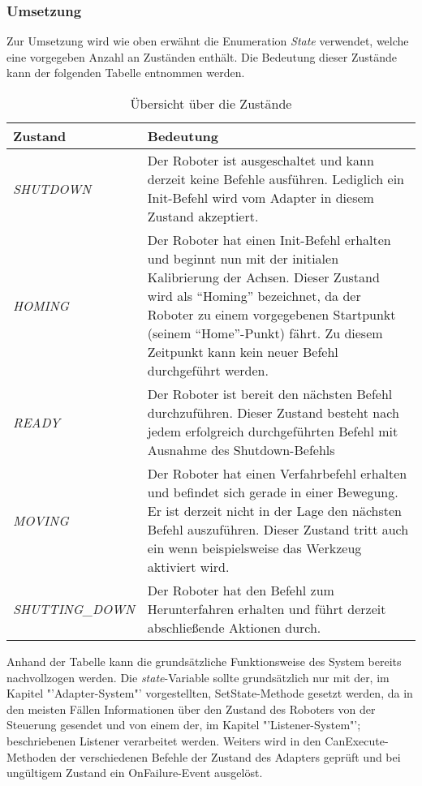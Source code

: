 \subsubsection{Umsetzung}
Zur Umsetzung wird wie oben erwähnt die Enumeration \textit{State} verwendet, welche eine vorgegeben Anzahl an Zuständen enthält. Die Bedeutung dieser Zustände kann der folgenden Tabelle entnommen werden.
\newpage
\begin{table}
\begin{tabular}{|p{4cm}|p{10cm}|}
\hline \rowcolor{lightgray}
\textbf{Zustand} & \textbf{Bedeutung}\\
\hline
\textit{SHUTDOWN} & Der Roboter ist ausgeschaltet und kann derzeit keine Befehle ausführen. Lediglich ein Init-Befehl wird vom Adapter in diesem Zustand akzeptiert.\\
\hline
\textit{HOMING} & Der Roboter hat einen Init-Befehl erhalten und beginnt nun mit der initialen Kalibrierung der Achsen. Dieser Zustand wird als “Homing” bezeichnet, da der Roboter zu einem vorgegebenen Startpunkt (seinem “Home”-Punkt) fährt. Zu diesem Zeitpunkt kann kein neuer Befehl durchgeführt werden.\\
\hline
\textit{READY} & Der Roboter ist bereit den nächsten Befehl durchzuführen. Dieser Zustand besteht nach jedem erfolgreich durchgeführten Befehl mit Ausnahme des Shutdown-Befehls \\
\hline
\textit{MOVING} & Der Roboter hat einen Verfahrbefehl erhalten und befindet sich gerade in einer Bewegung. Er ist derzeit nicht in der Lage den nächsten Befehl auszuführen. Dieser Zustand tritt auch ein wenn beispielsweise das Werkzeug aktiviert wird.\\
\hline
\textit{SHUTTING\_DOWN} & Der Roboter hat den Befehl zum Herunterfahren erhalten und führt derzeit abschließende Aktionen durch.\\ 
\hline
\end{tabular}
\caption{Übersicht über die Zustände}
\end{table}
Anhand der Tabelle kann die grundsätzliche Funktionsweise des System bereits nachvollzogen werden. Die \textit{state}-Variable sollte grundsätzlich nur mit der, im Kapitel "'Adapter-System"' vorgestellten, SetState-Methode gesetzt werden, da in den meisten Fällen Informationen über den Zustand des Roboters von der Steuerung gesendet und von einem der, im Kapitel "'Listener-System"'; beschriebenen Listener verarbeitet werden. Weiters wird in den CanExecute-Methoden der verschiedenen Befehle der Zustand des Adapters geprüft und bei ungültigem Zustand ein OnFailure-Event ausgelöst.\\
